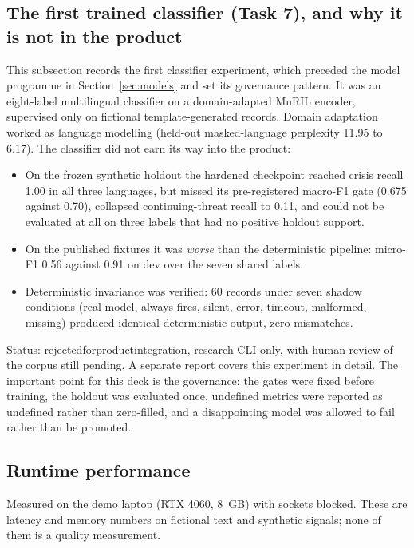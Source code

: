 \documentclass[11pt,a4paper]{article}
\newcommand{\codeus}{\textunderscore\allowbreak}
\DeclareRobustCommand{\code}[1]{{\ttfamily\let\_\codeus #1}}
\begin{document}
\subsection{The first trained classifier (Task 7), and why it is not in the product}
\label{sec:shadow}
This subsection records the first classifier experiment, which preceded the model programme in
Section~\ref{sec:models} and set its governance pattern. It was an eight-label multilingual classifier
on a domain-adapted MuRIL encoder, supervised only on fictional template-generated records. Domain adaptation worked as language
modelling (held-out masked-language perplexity 11.95 to 6.17). The classifier did not earn its way
into the product:

\begin{itemize}
  \item On the frozen synthetic holdout the hardened checkpoint reached crisis recall 1.00 in all
        three languages, but missed its pre-registered macro-F1 gate (0.675 against 0.70), collapsed
        continuing-threat recall to 0.11, and could not be evaluated at all on three labels that had
        no positive holdout support.
  \item On the published fixtures it was \emph{worse} than the deterministic pipeline: micro-F1 0.56
        against 0.91 on dev over the seven shared labels.
  \item Deterministic invariance was verified: 60 records under seven shadow conditions (real model,
        always fires, silent, error, timeout, malformed, missing) produced identical deterministic
        output, zero mismatches.
\end{itemize}

\noindent Status: \code{rejected\_for\_product\_integration}, research CLI only, with human review of
the corpus still pending. A separate report covers this experiment in detail. The important point for
this deck is the governance: the gates were fixed before training, the holdout was evaluated once,
undefined metrics were reported as undefined rather than zero-filled, and a disappointing model was
allowed to fail rather than be promoted.

\subsection{Runtime performance}
\label{sec:runtimeperf}
Measured on the demo laptop (RTX 4060, 8~GB) with sockets blocked. These are latency and memory
numbers on fictional text and synthetic signals; none of them is a quality measurement.
\end{document}
